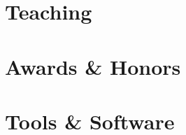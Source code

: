 \documentclass[11pt]{article} %
\begin{document}


\section*{Teaching}
\label{teaching}



\section*{Awards \& Honors}
\label{awards}



\section*{Tools \& Software}
\label{tools}











% 


% 
\end{document}
